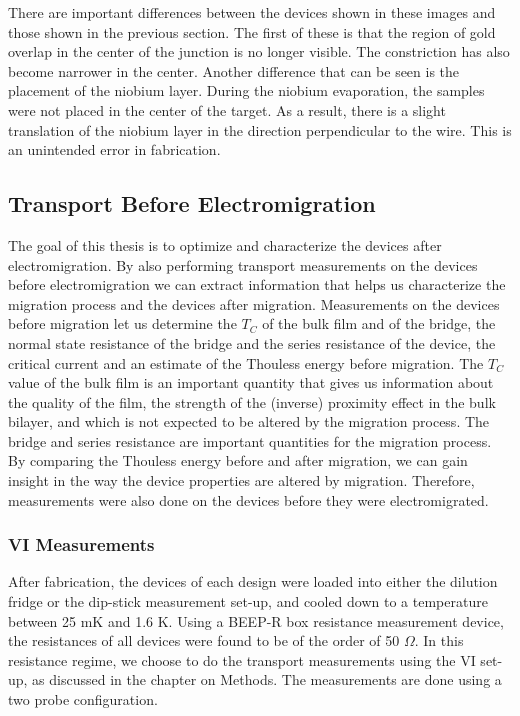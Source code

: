 There are important differences between the devices shown in these images and those shown in the previous section. The first of these is that the region of gold overlap in the center of the junction is no longer visible. The constriction has also become narrower in the center. Another difference that can be seen is the placement of the niobium layer. During the niobium evaporation, the samples were not placed in the center of the target. As a result, there is a slight translation of the niobium layer in the direction perpendicular to the wire. This is an unintended error in fabrication.

\subsection{Transport Before Electromigration}

The goal of this thesis is to optimize and characterize the devices after electromigration. By also performing transport measurements on the devices before electromigration we can extract information that helps us characterize the migration process and the devices after migration. Measurements on the devices before migration let us determine the $T_C$ of the bulk film and of the bridge, the normal state resistance of the bridge and the series resistance of the device, the critical current and an estimate of the Thouless energy before migration. The $T_C$ value of the bulk film is an important quantity that gives us information about the quality of the film, the strength of the (inverse) proximity effect in the bulk bilayer, and which is not expected to be altered by the migration process. The bridge and series resistance are important quantities for the migration process. By comparing the Thouless energy before and after migration, we can gain insight in the way the device properties are altered by migration. Therefore, measurements were also done on the devices before they were electromigrated.

\subsubsection{VI Measurements}

After fabrication, the devices of each design were loaded into either the dilution fridge or the dip-stick measurement set-up, and cooled down to a temperature between 25 mK and 1.6 K. Using a BEEP-R box resistance measurement device, the resistances of all devices were found to be of the order of 50 $\Omega$. In this resistance regime, we choose to do the transport measurements using the VI set-up, as discussed in the chapter on Methods. The measurements are done using a two probe configuration.

